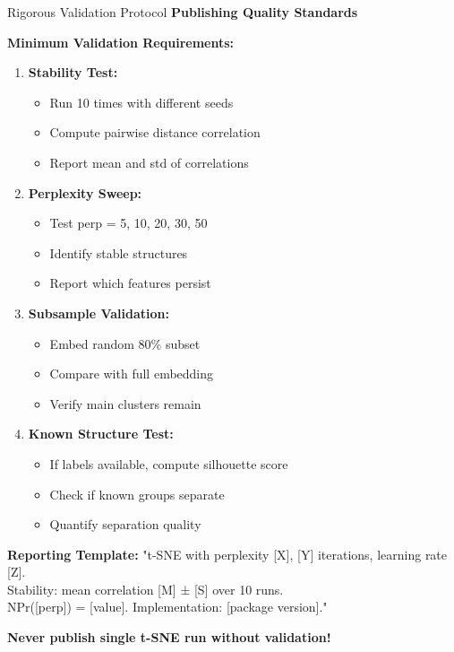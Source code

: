 \documentclass[10pt]{beamer}
\newcommand{\emphtext}[1]{\textcolor{upcblue}{\textbf{#1}}}
\newcommand{\warningbox}[1]{\colorbox{red!10}{\begin{minipage}{0.85\textwidth}\centering #1\end{minipage}}}
\begin{document}
\begin{frame}{Rigorous Validation Protocol}
\emphtext{Publishing Quality Standards}

\vspace{0.3cm}
\textbf{Minimum Validation Requirements:}

\begin{enumerate}
\footnotesize
\item \textbf{Stability Test:}
   \begin{itemize}
   \tiny
   \item Run 10 times with different seeds
   \item Compute pairwise distance correlation
   \item Report mean and std of correlations
   \end{itemize}

\item \textbf{Perplexity Sweep:}
   \begin{itemize}
   \tiny
   \item Test perp = {5, 10, 20, 30, 50}
   \item Identify stable structures
   \item Report which features persist
   \end{itemize}

\item \textbf{Subsample Validation:}
   \begin{itemize}
   \tiny
   \item Embed random 80\% subset
   \item Compare with full embedding
   \item Verify main clusters remain
   \end{itemize}

\item \textbf{Known Structure Test:}
   \begin{itemize}
   \tiny
   \item If labels available, compute silhouette score
   \item Check if known groups separate
   \item Quantify separation quality
   \end{itemize}
\end{enumerate}

\vspace{0.3cm}
\textbf{Reporting Template:}
\footnotesize
"t-SNE with perplexity [X], [Y] iterations, learning rate [Z].\\
Stability: mean correlation [M] ± [S] over 10 runs.\\
NPr([perp]) = [value]. Implementation: [package version]."

\begin{center}
\warningbox{\footnotesize\textbf{Never publish single t-SNE run without validation!}}
\end{center}
\end{frame}
\end{document}
